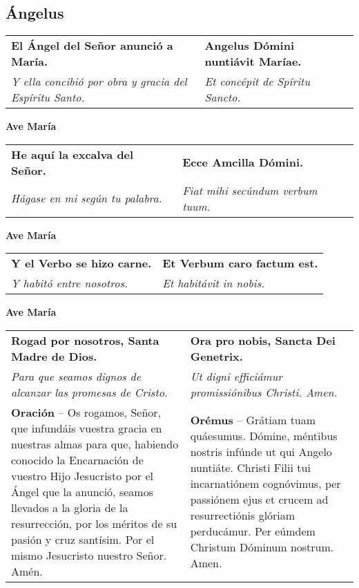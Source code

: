 \documentclass[../devocionario.tex]{subfiles}
\begin{document}
    \subsection*{Ángelus}

    \begin{tabular} { p{} p{} }
        \textbf{El Ángel del Señor anunció a María.} & \textbf{Angelus Dómini nuntiávit Maríae.}\\
        \textit{Y ella concibió por obra y gracia del Espíritu Santo.} & \textit{Et concépit de Spíritu Sancto.}
    \end{tabular}

    \begin{center}
        \textbf{Ave María}
    \end{center}

    \begin{tabular} { p{} p{} }
        \textbf{He aquí la excalva del Señor.} & \textbf{Ecce Amcilla Dómini.}\\
        \textit{Hágase en mi según tu palabra.} & \textit{Fiat mihi secúndum verbum tuum.}
    \end{tabular}

    \begin{center}
        \textbf{Ave María}
    \end{center}

    \begin{tabular} { p{} p{} }
        \textbf{Y el Verbo se hizo carne.} & \textbf{Et Verbum caro factum est.}\\
        \textit{Y habitó entre nosotros.} & \textit{Et habitávit in nobis.}
    \end{tabular}

    \begin{center}
        \textbf{Ave María}
    \end{center}

    \begin{tabular} { p{} p{} }
        \textbf{Rogad por nosotros, Santa Madre de Dios.} & \textbf{Ora pro nobis, Sancta Dei Genetrix.}\\
        \textit{Para que seamos dignos de alcanzar las promesas de Cristo.} & \textit{Ut digni efficiámur promissiónibus Christi. Amen.}\\
        \textbf{Oración} -- Os rogamos, Señor, que infundáis vuestra gracia en nuestras almas para que, 
        habiendo conocido la Encarnación de vuestro Hijo Jesucristo por el Ángel que la anunció, 
        seamos llevados a la gloria de la resurrección, por los méritos de su pasión y cruz santísim. 
        Por el mismo Jesucristo nuestro Señor. Amén. & 
        \textbf{Orémus} -- Grátiam tuam quáesumus. Dómine, méntibus nostris infúnde ut qui Angelo nuntiáte. 
        Christi Filii tui incarnatiónem cognóvimus, per passiónem ejus et crucem ad resurrectiónis glóriam perducámur. 
        Per eúmdem Christum Dóminum nostrum. Amen.
    \end{tabular}
\end{document}
